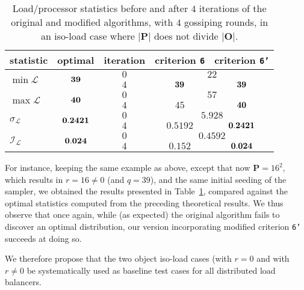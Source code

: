\begin{table}[htb!]
\begin{center}
\begin{tabular}{lcccc}
\hline
statistic & \textbf{optimal} & iteration
& criterion \texttt{6} & criterion \texttt{6'} \\
\hline\hline
\multirow{2}{*}{$\min{\mathcal{L}}$}
&\multirow{2}{*}{$\bf39$}
&$0$ &\multicolumn{2}{c}{$22$} \\
&&$4$ &$\bf39$    &$\bf39$ \\\hline
\multirow{2}{*}{$\max{\mathcal{L}}$}
&\multirow{2}{*}{$\bf40$}
&$0$ &\multicolumn{2}{c}{$57$} \\
&&$4$ &$45$   &$\bf40$ \\\hline
\multirow{2}{*}{$\sigma_{\mathcal{L}}$}
&\multirow{2}{*}{$\bf0.2421$}
&$0$ &\multicolumn{2}{c}{$5.928$} \\
&&$4$ &$0.5192$  &$\bf0.2421$ \\\hline
\multirow{2}{*}{$\mathcal{I}_\mathcal{L}$}
&\multirow{2}{*}{$\bf0.024$}
&$0$ &\multicolumn{2}{c}{$0.4592$} \\
&&$4$ &$0.152$  &$\bf0.024$ \\\hline
\end{tabular}
\end{center}
\caption{\label{t:iso-load-not-divisible}
Load/processor statistics before and after $4$ iterations of the
original and modified algorithms, with $4$ gossiping rounds, in an
iso-load case where $\vert\mathbf{P}\vert$ does not divide
$\vert\mathbf{O}\vert$.}
\end{table}
For instance, keeping the same example as above, except 
that now $\mathbf{P}=16^2$, which results in $r=16\neq0$ (and $q=39$),
and the same initial seeding of the sampler, we obtained
the results presented in Table~\ref{t:iso-load-not-divisible},
compared against the optimal statistics computed from the preceding
theoretical results.
We thus observe that once again, while (as expected) the original
algorithm fails to discover an optimal distribution, our version
incorporating modified criterion \texttt{6'} succeeds at doing so.

We therefore propose that the two object iso-load cases (with $r=0$
and with $r\neq0$ be systematically used as baseline test cases for
all distributed load balancers.
